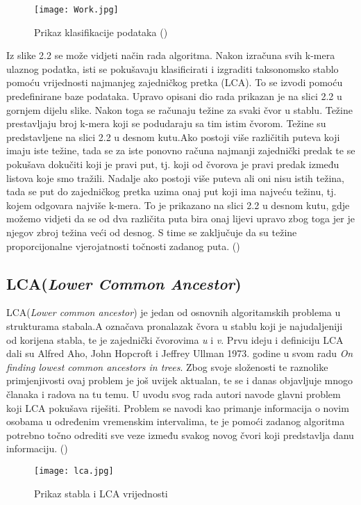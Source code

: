 \documentclass[times, utf8, zavrsni]{fer}
\begin{document}
\begin{figure}[!htbp]
	\centering
	\texttt{[image: Work.jpg]}
	\caption{Prikaz klasifikacije podataka (\cite{Kraken})}
	\label{Klasifikacija}
\end{figure}

Iz slike 2.2 se može vidjeti način rada algoritma. Nakon izračuna svih  k-mera ulaznog podatka, isti se pokušavaju klasificirati i izgraditi taksonomsko stablo pomoću vrijednosti najmanjeg zajedničkog pretka (LCA). To se izvodi pomoću predefinirane baze podataka. Upravo opisani dio rada prikazan je na slici 2.2  u gornjem dijelu slike. Nakon toga se računaju težine za svaki čvor u stablu. Težine prestavljaju broj k-mera koji se podudaraju sa tim istim čvorom. Težine su predstavljene na slici 2.2 u desnom kutu.Ako postoji više različitih puteva koji imaju iste težine, tada se za iste ponovno računa najmanji zajednički predak te se pokušava dokučiti koji je pravi put, tj. koji od čvorova je pravi predak između listova koje smo tražili. Nadalje ako postoji više puteva ali oni nisu istih težina, tada se put do zajedničkog pretka uzima onaj put koji ima najveću težinu, tj. kojem odgovara najviše k-mera. To je prikazano na slici 2.2 u desnom kutu, gdje možemo vidjeti da se od dva različita puta bira onaj lijevi upravo zbog toga jer je njegov zbroj težina veći od desnog. S time se zaključuje da su težine proporcijonalne vjerojatnosti točnosti zadanog puta. (\cite{Kraken})


\subsection{LCA(\textit{Lower Common Ancestor})}
LCA(\textit{Lower common ancestor}) je jedan od osnovnih algoritamskih problema u strukturama stabala.A označava pronalazak čvora u stablu koji je najudaljeniji od korijena stabla, te je zajednički čvorovima \textit{u} i \textit{v}. Prvu ideju i definiciju LCA dali su Alfred Aho, John Hopcroft i Jeffrey Ullman 1973. godine u svom radu \textit{On finding lowest common ancestors in trees}. Zbog svoje složenosti te raznolike primjenjivosti ovaj problem je još uvijek aktualan, te se i danas objavljuje mnogo članaka i radova na tu temu. U uvodu svog rada autori navode glavni problem koji LCA pokušava riješiti. Problem se navodi kao primanje informacija o novim osobama u određenim vremenskim intervalima, te je pomoći zadanog algoritma potrebno točno odrediti sve veze između svakog novog čvori koji predstavlja danu informaciju. (\cite{lca1})
\begin{figure}[!htbp]
	\centering
	\texttt{[image: lca.jpg]}
	\caption{Prikaz stabla i LCA vrijednosti}
	\label{LCA}
\end{figure}
\end{document}
